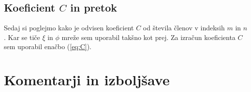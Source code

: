 \documentclass[a4paper]{article}
\begin{document}
\subsection{Koeficient $C$ in pretok}
Sedaj si poglejmo kako je odvisen koeficient $C$ od števila členov v indeksih $m$ in $n$. Kar se tiče $\xi$ in $\phi$ mreže
sem uporabil takšno kot prej. Za izračun koeficienta $C$ sem uporabil enačbo (\ref{eq:C}). 




\section{Komentarji in izboljšave}


\newpage


\end{document}

